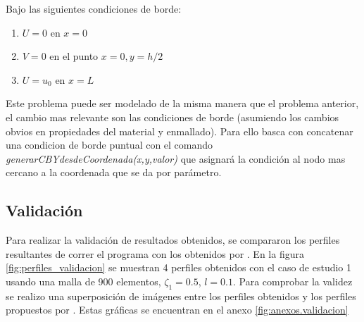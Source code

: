 \begin{enumerate}
		Bajo las siguientes condiciones de borde:
		\begin{enumerate}
			\item[] $U = 0$ en $x=0$
			\item[] $V = 0$ en el punto $x=0,y=h/2$
			\item[] $U = u_0$ en $x=L$
		\end{enumerate}

		Este problema puede ser modelado de la misma manera que el problema anterior, el cambio mas relevante son las condiciones de borde (asumiendo los cambios obvios en propiedades del material y enmallado). Para ello basca con concatenar una condicion de borde puntual con el comando \textit{generarCBYdesdeCoordenada(x,y,valor)} que asignará la condición al nodo mas cercano a la coordenada que se da por parámetro.

	\end{enumerate}
	\subsection{Validación}
	\label{sub:validacion}

	Para realizar la validación de resultados obtenidos, se compararon los perfiles resultantes de correr el programa con los obtenidos por \cite{Pisano2009}. En la figura \ref{fig:perfiles_validacion} se muestran 4 perfiles obtenidos con el caso de estudio 1 usando una malla de 900 elementos, $\zeta_1=0.5$, $l=0.1$. Para comprobar la validez se realizo una superposición de imágenes entre los perfiles obtenidos y los perfiles propuestos por \cite{Pisano2009}. Estas gráficas se encuentran en el anexo \ref{fig:anexos.validacion}

